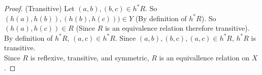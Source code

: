 \documentclass[11pt]{letter}
\theoremstyle{definition}
\begin{document}
\begin{enumerate}
\begin{proof}
                                  (Transitive) Let $(a,b),(b,c)\in h^*R$. So $(h(a),h(b)),(h(b),h(c)))\in Y$ (By definition of $h^*R$). So $(h(a),h(c))\in R$ (Since $R$ is an equivalence relation therefore transitive). By definition of $h^*R$, $(a,c)\in h^*R$. Since $(a,b),(b,c),(a,c)\in h^*R$, $h^*R$ is transitive.\\
                                  Since $R$ is reflexive, transitive, and symmetric, $R$ is an equivallence relation on $X$.
                                \end{proof}
		\end{enumerate}
\end{document}
